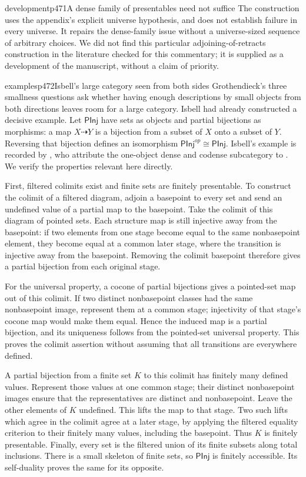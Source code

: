 \begin{dcomment}{development}{p471}{A dense family of presentables need not suffice}
The construction uses the appendix's explicit universe hypothesis, and does not establish failure in every universe. It repairs the dense-family issue without a universe-sized sequence of arbitrary choices. We did not find this particular adjoining-of-retracts construction in the literature checked for this commentary; it is supplied as a development of the manuscript, without a claim of priority.
\end{dcomment}

\begin{dcomment}{examples}{p472}{Isbell's large category seen from both sides}
Grothendieck's three smallness questions ask whether having enough descriptions by small objects from both directions leaves room for a large category. Isbell had already constructed a decisive example. Let $\mathsf{PInj}$ have sets as objects and partial bijections as morphisms: a map $X\dashrightarrow Y$ is a bijection from a subset of $X$ onto a subset of $Y$. Reversing that bijection defines an isomorphism $\mathsf{PInj}^{op}\cong\mathsf{PInj}$. Isbell's example is recorded by \citet[Example~8.7]{AveryLeinster2021}, who attribute the one-object dense and codense subcategory to \citet[Example~1]{Isbell1968Small}. We verify the properties relevant here directly.

First, filtered colimits exist and finite sets are finitely presentable. To construct the colimit of a filtered diagram, adjoin a basepoint to every set and send an undefined value of a partial map to the basepoint. Take the colimit of this diagram of pointed sets. Each structure map is still injective away from the basepoint: if two elements from one stage become equal to the same nonbasepoint element, they become equal at a common later stage, where the transition is injective away from the basepoint. Removing the colimit basepoint therefore gives a partial bijection from each original stage.

For the universal property, a cocone of partial bijections gives a pointed-set map out of this colimit. If two distinct nonbasepoint classes had the same nonbasepoint image, represent them at a common stage; injectivity of that stage's cocone map would make them equal. Hence the induced map is a partial bijection, and its uniqueness follows from the pointed-set universal property. This proves the colimit assertion without assuming that all transitions are everywhere defined.

A partial bijection from a finite set $K$ to this colimit has finitely many defined values. Represent those values at one common stage; their distinct nonbasepoint images ensure that the representatives are distinct and nonbasepoint. Leave the other elements of $K$ undefined. This lifts the map to that stage. Two such lifts which agree in the colimit agree at a later stage, by applying the filtered equality criterion to their finitely many values, including the basepoint. Thus $K$ is finitely presentable. Finally, every set is the filtered union of its finite subsets along total inclusions. There is a small skeleton of finite sets, so $\mathsf{PInj}$ is finitely accessible. Its self-duality proves the same for its opposite.


\end{dcomment}
